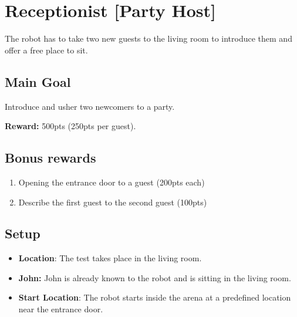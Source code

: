 \section{Receptionist [Party Host]}
\label{test:receptionist}
The robot has to take two new guests to the living room to introduce them and offer a free place to sit.



\subsection*{Main Goal}
Introduce and usher two newcomers to a party.

\noindent\textbf{Reward:} 500pts (250pts per guest).

\subsection*{Bonus rewards}
\begin{enumerate}[nosep]
	\item Opening the entrance door to a guest (200pts each)
	\item Describe the first guest to the second guest  (100pts)
\end{enumerate}


\subsection*{Setup}
\begin{itemize}
	\item \textbf{Location}: The test takes place in the living room.

	\item \textbf{John:} John is already known to the robot and is sitting in the living room.

	\item \textbf{Start Location}: The robot starts inside the arena at a predefined location near the entrance door.

\end{itemize}

